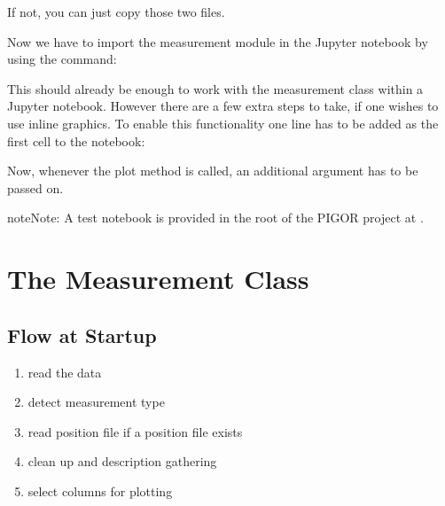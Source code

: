 \documentclass[letterpaper,10pt,english]{sphinxmanual}
\begin{document}
If not, you can just copy those two files.

Now we have to import the measurement module in the Jupyter notebook by using the  command:

\begin{sphinxVerbatim}[commandchars=\\\{\}]
 
\end{sphinxVerbatim}

This should already be enough to work with the measurement class within a Jupyter notebook. However there are a few extra steps to take, if one wishes to use inline graphics. To enable this functionality one line has to be added as the first cell to the notebook:

\begin{sphinxVerbatim}[commandchars=\\\{\}]
 
\end{sphinxVerbatim}

Now, whenever the plot method is called, an additional argument has to be passed on.

\begin{sphinxVerbatim}[commandchars=\\\{\}]
\end{sphinxVerbatim}

\begin{sphinxadmonition}{note}{Note:}
A test notebook is provided in the root of the PIGOR project at .
\end{sphinxadmonition}


\chapter{The Measurement Class}
\label{\detokenize{measurement:the-measurement-class}}\label{\detokenize{measurement::doc}}

\section{Flow at Startup}
\label{\detokenize{measurement:flow-at-startup}}\begin{enumerate}
\def\theenumi{\arabic{enumi}}
\def\labelenumi{\theenumi .}
\makeatletter\def\p@enumii{\p@enumi \theenumi .}\makeatother
\item {} 
read the data

\item {} 
detect measurement type

\item {} 
read position file if a position file exists

\item {} 
clean up and description gathering

\item {} 
select columns for plotting

\end{enumerate}
\end{document}
